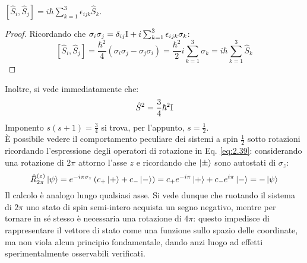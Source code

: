 \begin{proposition}
	$ \left[ \hat{S}_i,\hat{S}_j \right] = i\hbar \sum_{k = 1}^{3} \epsilon_{ijk} \hat{S}_k $.
\end{proposition}
\begin{proof}
	Ricordando che $ \sigma_i \sigma_j = \delta_{ij} \mathbf{\text{I}} + i \sum_{k = 1}^{3} \epsilon_{ijk} \sigma_k $:
	\begin{equation*}
		\left[ \hat{S}_i,\hat{S}_j \right] = \frac{\hbar^2}{4} \left( \sigma_i \sigma_j - \sigma_j \sigma_i \right) = \frac{\hbar^2}{2} i \sum_{k = 1}^{3} \sigma_k = i\hbar \sum_{k = 1}^{3} \hat{S}_k
	\end{equation*}
\end{proof}

Inoltre, si vede immediatamente che:
\begin{equation}
	\hat{S}^2 = \frac{3}{4} \hbar^2 \mathbf{\text{I}}
	\label{eq:2.49}
\end{equation}
Imponento $ s (s + 1) = \frac{3}{4} $ si trova, per l'appunto, $ s = \frac{1}{2} $.\\
È possibile vedere il comportamento peculiare dei sistemi a spin $ \frac{1}{2} $ sotto rotazioni ricordando l'espressione degli operatori di rotazione in Eq. \ref{eq:2.39}: considerando una rotazione di $ 2\pi $ attorno l'asse $ z $ e ricordando che $ \ket{\pm} $ sono autostati di $ \sigma_z $:
\begin{equation}
	\hat{R}_{2\pi}^{(z)} \ket{\psi} = e^{-i \pi \sigma_z} \left( c_+ \ket{+} + c_- \ket{-} \right) = c_+ e^{-i\pi} \ket{+} + c_- e^{i\pi} \ket{-} = - \ket{\psi}
	\label{eq:2.50}
\end{equation}
Il calcolo è analogo lungo qualsiasi asse. Si vede dunque che ruotando il sistema di $ 2\pi $ uno stato di spin semi-intero acquista un segno negativo, mentre per tornare in sé stesso è necessaria una rotazione di $ 4\pi $: questo impedisce di rappresentare il vettore di stato come una funzione sullo spazio delle coordinate, ma non viola alcun principio fondamentale, dando anzi luogo ad effetti sperimentalmente osservabili verificati.










